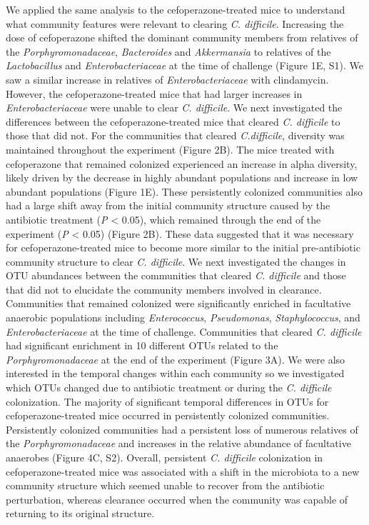 \documentclass[11pt,]{article}
\begin{document}
We applied the same analysis to the cefoperazone-treated mice to
understand what community features were relevant to clearing \emph{C.
difficile}. Increasing the dose of cefoperazone shifted the dominant
community members from relatives of the \emph{Porphyromonadaceae},
\emph{Bacteroides} and \emph{Akkermansia} to relatives of the
\emph{Lactobacillus} and \emph{Enterobacteriaceae} at the time of
challenge (Figure 1E, S1). We saw a similar increase in relatives of
\emph{Enterobacteriaceae} with clindamycin. However, the
cefoperazone-treated mice that had larger increases in
\emph{Enterobacteriaceae} were unable to clear \emph{C. difficile}. We
next investigated the differences between the cefoperazone-treated mice
that cleared \emph{C. difficile} to those that did not. For the
communities that cleared \emph{C.difficile}, diversity was maintained
throughout the experiment (Figure 2B). The mice treated with
cefoperazone that remained colonized experienced an increase in alpha
diversity, likely driven by the decrease in highly abundant populations
and increase in low abundant populations (Figure 1E). These persistently
colonized communities also had a large shift away from the initial
community structure caused by the antibiotic treatment (\emph{P}
\textless{} 0.05), which remained through the end of the experiment
(\emph{P} \textless{} 0.05) (Figure 2B). These data suggested that it
was necessary for cefoperazone-treated mice to become more similar to
the initial pre-antibiotic community structure to clear \emph{C.
difficile}. We next investigated the changes in OTU abundances between
the communities that cleared \emph{C. difficile} and those that did not
to elucidate the community members involved in clearance. Communities
that remained colonized were significantly enriched in facultative
anaerobic populations including \emph{Enterococcus}, \emph{Pseudomonas},
\emph{Staphylococcus}, and \emph{Enterobacteriaceae} at the time of
challenge. Communities that cleared \emph{C. difficile} had significant
enrichment in 10 different OTUs related to the \emph{Porphyromonadaceae}
at the end of the experiment (Figure 3A). We were also interested in the
temporal changes within each community so we investigated which OTUs
changed due to antibiotic treatment or during the \emph{C. difficile}
colonization. The majority of significant temporal differences in OTUs
for cefoperazone-treated mice occurred in persistently colonized
communities. Persistently colonized communities had a persistent loss of
numerous relatives of the \emph{Porphyromonadaceae} and increases in the
relative abundance of facultative anaerobes (Figure 4C, S2). Overall,
persistent \emph{C. difficile} colonization in cefoperazone-treated mice
was associated with a shift in the microbiota to a new community
structure which seemed unable to recover from the antibiotic
perturbation, whereas clearance occurred when the community was capable
of returning to its original structure.
\end{document}
